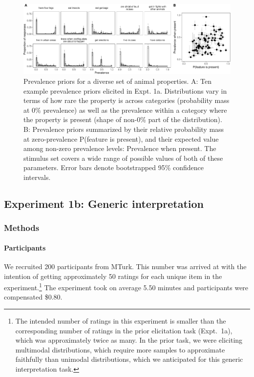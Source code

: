 \documentclass[floatsintext,man]{apa6}
\let\oldparagraph\paragraph
\renewcommand{\paragraph}[1]{\oldparagraph{#1}\mbox{}}
\let\rmarkdownfootnote\footnote%
\def\footnote{\protect\rmarkdownfootnote}
\begin{document}
\begin{figure}
\centering
\includegraphics{genint_files/figure-latex/genInt-prevPrior-1.pdf}
\caption{\label{fig:genInt-prevPrior}Prevalence priors for a diverse set of animal properties. A: Ten example prevalence priors elicited in Expt. 1a. Distributions vary in terms of how rare the property is across categories (probability mass at 0\% prevalence) as well as the prevalence within a category where the property is present (shape of non-0\% part of the distribution). B: Prevalence priors summarized by their relative probability mass at zero-prevalence P(feature is present), and their expected value among non-zero prevalence levels: Prevalence when present. The stimulus set covers a wide range of possible values of both of these parameters. Error bars denote bootstrapped 95\% confidence intervals.}
\end{figure}

\hypertarget{experiment-1b-generic-interpretation}{%
\subsection{Experiment 1b: Generic interpretation}\label{experiment-1b-generic-interpretation}}

\hypertarget{methods-1}{%
\subsubsection{Methods}\label{methods-1}}

\hypertarget{participants-2}{%
\paragraph{Participants}\label{participants-2}}
%
We recruited 200 participants from MTurk.
This number was arrived at with the intention of getting approximately 50 ratings for each unique item in the experiment.\footnote{The intended number of ratings in this experiment is smaller than the corresponding number of ratings in the prior elicitation task (Expt.~1a), which was approximately twice as many. In the prior task, we were eliciting multimodal distributions, which require more samples  to approximate faithfully than unimodal distributions, which we anticipated for this generic interpretation task.}
The experiment took on average 5.50 minutes and participants were compensated \$0.80.
\end{document}
